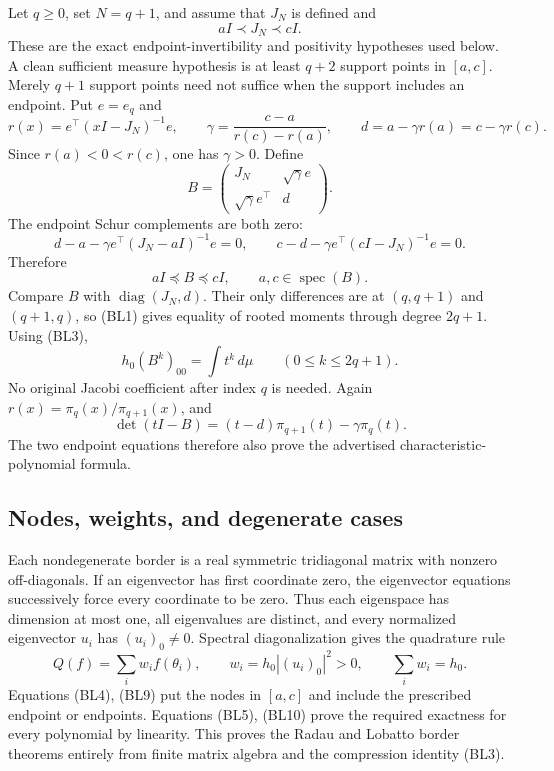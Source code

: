 \documentclass[11pt,a4paper]{article}
\theoremstyle{definition}
\begin{document}
Let $q\ge0$, set $N=q+1$, and assume that $J_N$ is defined and
\[
 aI\prec J_N\prec cI.
 \tag{BL7}
\]
These are the exact endpoint-invertibility and positivity hypotheses
used below. A clean sufficient measure hypothesis is at least $q+2$
support points in $[a,c]$. Merely $q+1$ support points need not suffice
when the support includes an endpoint.
Put $e=e_q$ and
\[
 r(x)=e^\top(xI-J_N)^{-1}e,
 \qquad
 \gamma=\frac{c-a}{r(c)-r(a)},\qquad
 d=a-\gamma r(a)=c-\gamma r(c).
\]
Since $r(a)<0<r(c)$, one has $\gamma>0$. Define
\[
 B=\begin{pmatrix}J_N&\sqrt\gamma e\\
                   \sqrt\gamma e^\top&d\end{pmatrix}.
 \tag{BL8}
\]
The endpoint Schur complements are both zero:
\[
 d-a-\gamma e^\top(J_N-aI)^{-1}e=0,
 \qquad
 c-d-\gamma e^\top(cI-J_N)^{-1}e=0.
\]
Therefore
\[
 aI\preceq B\preceq cI,\qquad
 a,c\in\operatorname{spec}(B).
 \tag{BL9}
\]
Compare $B$ with $\operatorname{diag}(J_N,d)$. Their only differences
are at $(q,q+1)$ and $(q+1,q)$, so (BL1) gives equality of rooted
moments through degree $2q+1$. Using (BL3),
\[
 h_0(B^k)_{00}=\int t^k\,d\mu\qquad(0\le k\le2q+1).
 \tag{BL10}
\]
No original Jacobi coefficient after index $q$ is needed.
Again $r(x)=\pi_q(x)/\pi_{q+1}(x)$, and
\[
 \det(tI-B)=(t-d)\pi_{q+1}(t)-\gamma\pi_q(t).
\]
The two endpoint equations therefore also prove the advertised
characteristic-polynomial formula.

\subsection{Nodes, weights, and degenerate cases}

Each nondegenerate border is a real symmetric tridiagonal matrix with
nonzero off-diagonals. If an eigenvector has first coordinate zero,
the eigenvector equations successively force every coordinate to be
zero. Thus each eigenspace has dimension at most one, all eigenvalues
are distinct, and every normalized eigenvector $u_i$ has
$(u_i)_0\ne0$. Spectral diagonalization gives the quadrature rule
\[
 Q(f)=\sum_i w_i f(\theta_i),\qquad
 w_i=h_0|(u_i)_0|^2>0,
 \qquad \sum_i w_i=h_0.
 \tag{BL11}
\]
Equations (BL4), (BL9) put the nodes in $[a,c]$ and include the
prescribed endpoint or endpoints. Equations (BL5), (BL10) prove
the required exactness for every polynomial by linearity.
This proves the Radau and Lobatto border theorems entirely from
finite matrix algebra and the compression identity (BL3).
\end{document}

